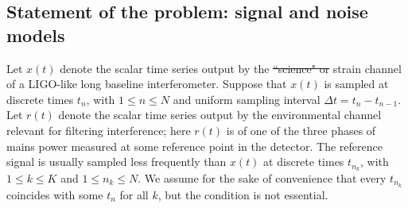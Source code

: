 \documentclass[pra,superscriptaddress,reprint,amsmath,amssymb,nofootinbib]{revtex4-2}
\providecommand{\DIFaddtex}[1]{{\protect\color{blue}\uwave{#1}}} %
\providecommand{\DIFdeltex}[1]{{\protect\color{red}\sout{#1}}}                      %
\providecommand{\DIFaddbegin}{} %
\providecommand{\DIFaddend}{} %
\providecommand{\DIFdelbegin}{} %
\providecommand{\DIFdelend}{} %
\providecommand{\DIFadd}[1]{\texorpdfstring{\DIFaddtex{#1}}{#1}} %
\providecommand{\DIFdel}[1]{\texorpdfstring{\DIFdeltex{#1}}{}} %
\newcommand{\DIFscaledelfig}{0.5}
\newlength{\DIFdelgraphicswidth} %
\newlength{\DIFdelgraphicsheight} %
\newcommand{\DIFaddincludegraphics}[2][]{{\color{blue}\fbox{\DIFOincludegraphics[#1]{#2}}}} %
\newcommand{\DIFdelincludegraphics}[2][]{%
\sbox{\DIFdelgraphicsbox}{\DIFOincludegraphics[#1]{#2}}%
\settoboxwidth{\DIFdelgraphicswidth}{\DIFdelgraphicsbox} %
\settoboxtotalheight{\DIFdelgraphicsheight}{\DIFdelgraphicsbox} %
\scalebox{\DIFscaledelfig}{%
\parbox[b]{\DIFdelgraphicswidth}{\usebox{\DIFdelgraphicsbox}\\[-\baselineskip] \rule{\DIFdelgraphicswidth}{0em}}\llap{\resizebox{\DIFdelgraphicswidth}{\DIFdelgraphicsheight}{%
\setlength{\unitlength}{\DIFdelgraphicswidth}%
\begin{picture}(1,1)%
\thicklines\linethickness{2pt} %
{\color[rgb]{1,0,0}\put(0,0){\framebox(1,1){}}}%
{\color[rgb]{1,0,0}\put(0,0){\line( 1,1){1}}}%
{\color[rgb]{1,0,0}\put(0,1){\line(1,-1){1}}}%
\end{picture}%
}\hspace*{3pt}}} %
} %
\DeclareRobustCommand{\DIFaddbegin}{\DIFOaddbegin \let\includegraphics\DIFaddincludegraphics} %
\DeclareRobustCommand{\DIFaddend}{\DIFOaddend \let\includegraphics\DIFOincludegraphics} %
\DeclareRobustCommand{\DIFdelbegin}{\DIFOdelbegin \let\includegraphics\DIFdelincludegraphics} %
\DeclareRobustCommand{\DIFdelend}{\DIFOaddend \let\includegraphics\DIFOincludegraphics} %
\begin{document}
\DIFaddbegin 










\DIFaddend %
\subsection{Statement of the problem: signal and noise models}  \label{sec21}
Let $x(t)$ denote the scalar time series output by the \DIFdelbegin \DIFdel{``science" or }\DIFdelend \DIFaddbegin \DIFadd{GW }\DIFaddend strain channel of a LIGO-like long baseline interferometer. Suppose that $x(t)$ is sampled at discrete times $t_n$, with $1 \leq n \leq N$ and uniform sampling interval $\Delta t = t_n - t_{n-1}$. Let $r(t)$ denote the scalar time series output by the environmental \DIFaddbegin \DIFadd{reference }\DIFaddend channel relevant for filtering interference; here $r(t)$ is of one of the three phases of mains power measured at some reference point in the detector. The reference signal is usually sampled less frequently than $x(t)$ at discrete times $t_{n_k}$, with $1 \leq k \leq K$ and $1 \leq n_k \leq N$. We assume for the sake of convenience that every $t_{n_k}$ coincides with some $t_n$ for all $k$, but the condition is not essential. \newline 
\end{document}
